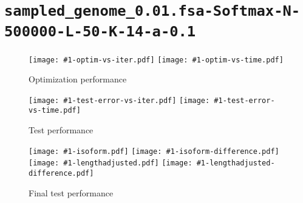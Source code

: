 \documentclass{article}
\newcommand{\showallplots}[1]{%
\section{\nolinkurl{#1}}
\begin{figure}[h]
\centering
\texttt{[image: \#1-optim-vs-iter.pdf]}
\texttt{[image: \#1-optim-vs-time.pdf]}
\caption{Optimization performance}
\end{figure}
\begin{figure}[h]
\centering
\texttt{[image: \#1-test-error-vs-iter.pdf]}
\texttt{[image: \#1-test-error-vs-time.pdf]}
\caption{Test performance}
\end{figure}
\begin{figure}[h]
\centering
\texttt{[image: \#1-isoform.pdf]}
\texttt{[image: \#1-isoform-difference.pdf]}
\texttt{[image: \#1-lengthadjusted.pdf]}
\texttt{[image: \#1-lengthadjusted-difference.pdf]}
\caption{Final test performance}
\end{figure}
}
\begin{document}
\showallplots{sampled_genome_0.01.fsa-Softmax-N-500000-L-50-K-14-a-0.1}
\end{document}
